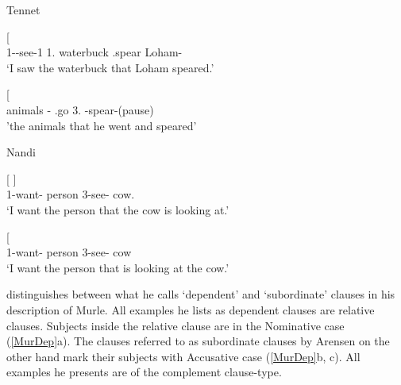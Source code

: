 \begin{exe}\ex\label{TenRel} {Tennet} \citep[Surmic; Sudan; ][259, 255]{Randal:1998}\nopagebreak[4] 
\begin{xlist}
\ex\gll{}    {\rm[}   \textipa{l\=*oh\'{\=*a}m\textbf{-i}}{\rm]}\\
1-\pfv{}-see-1\sg{} 1\sg{}.\nom{} waterbuck \am{} \pst{} \pfv{}.spear Loham-\nom{}\\
`I saw the waterbuck that Loham speared.' 

\ex\gll{}  {\rm[}  \textbf{} \textipa{\'a-k\'at-a}{\rm]}\\
animals \am{}-\pl{} \pfv{}.go 3\sg{}.\nom{} \pfv{}-spear-{(pause)}\\
'the animals that he went and speared' 
\end{xlist}
\end{exe}

\begin{exe}\ex\label{NanRel} {Nandi} \citep[Nilotic; Kenya; ][134, 133]{Creider:1989}\nopagebreak[4]
\begin{xlist}
\ex\gll{}   {\rm[}  \textbf{}{\rm]}\\
1\sg{}-want-\ipfv{} person \relativ{} 3-see-\ipfv{} cow.\nom{}\\
`I want the person that the cow is looking at.'

\ex\gll{}   {\rm[}  \textipa{te:t\`a}{\rm]}\\
1\sg{}-want-\ipfv{} person \relativ{} 3-see-\ipfv{} cow\\
`I want the person that is looking at the cow.'

\end{xlist}
\end{exe}

\citet[112--114]{Arensen:1982} distinguishes between what he calls `dependent' and `subordinate' clauses in his description of Murle. 
All examples he lists as dependent clauses are relative clauses. 
Subjects inside the relative clause are in the Nominative  case (\ref{MurDep}a). 
The clauses referred to as subordinate clauses by Arensen on the other hand mark their subjects with Accusative case (\ref{MurDep}b, c). 
All examples he presents are of the complement clause-type.

